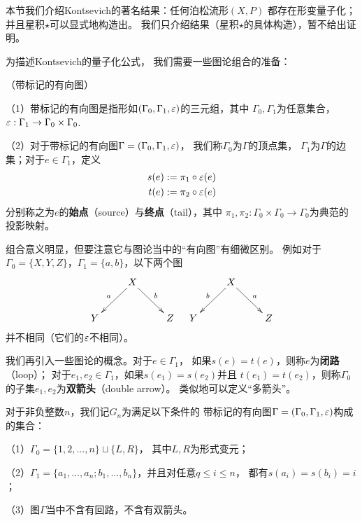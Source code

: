 本节我们介绍Kontsevich的著名结果：任何泊松流形$(X,P)$
都存在形变量子化；并且星积$\star$可以显式地构造出。
我们只介绍结果（星积$\star$的具体构造），暂不给出证明。


为描述Kontsevich的量子化公式，
我们需要一些图论组合的准备：

\begin{definition}（带标记的有向图）

（1）带标记的有向图是指形如$(\Gamma_0,\Gamma_1,\varepsilon)$的三元组，其中
$\Gamma_0,\Gamma_1$为任意集合，
$\varepsilon:\Gamma_1\to \Gamma_0\times \Gamma_0$.

（2）对于带标记的有向图$\Gamma=(\Gamma_0,\Gamma_1,\varepsilon)$，
我们称$\Gamma_0$为$\Gamma$的顶点集，
$\Gamma_1$为$\Gamma$的边集；对于$e\in \Gamma_1$，定义
\begin{eqnarray*}
s(e):=\pi_1\circ\varepsilon(e)\\
t(e):=\pi_2\circ\varepsilon(e)
\end{eqnarray*}
分别称之为$e$的\textbf{始点}（source）与\textbf{终点}（tail），其中
$\pi_1,\pi_2:\Gamma_0\times \Gamma_0\to \Gamma_0$为典范的投影映射。
\label{带标记的有向图-def}
\end{definition}

组合意义明显，但要注意它与图论当中的“有向图”有细微区别。
例如对于$\Gamma_0=\{X,Y,Z\}$，$\Gamma_1=\{a,b\}$，以下两个图
$$
  \xymatrix{
    &X\ar[dl]_{a}  \ar[dr]^b
    &
  \\
     Y
    &
    &Z
  }
\quad
  \xymatrix{
    &X\ar[dl]_{b}  \ar[dr]^a
    &
  \\
     Y
    &
    &Z
  }
$$
并不相同（它们的$\varepsilon$不相同）。

我们再引入一些图论的概念。对于$e\in \Gamma_1$，
如果$s(e)=t(e)$，则称$e$为\textbf{闭路}（loop）；
对于$e_1,e_2\in\Gamma_1$，如果$s(e_1)=s(e_2)$并且
$t(e_1)=t(e_2)$，则称$\Gamma_0$的子集${e_1,e_2}$为\textbf{双箭头}（double arrow）。
类似地可以定义“多箭头”。



\begin{notation}
对于非负整数$n$，我们记$G_n$为满足以下条件的
带标记的有向图$\Gamma=(\Gamma_0,\Gamma_1,\varepsilon)$构成的集合：

（1）$\Gamma_0=\{1,2,...,n\}\sqcup\{L,R\}$，
其中$L,R$为形式变元；

（2）$\Gamma_1=\{a_1,...,a_n;b_1,...,b_n\}$，并且对任意$q\leq i\leq n$，
都有$s(a_i)=s(b_i)=i$；

（3）图$\Gamma$当中不含有回路，不含有双箭头。
\end{notation}

